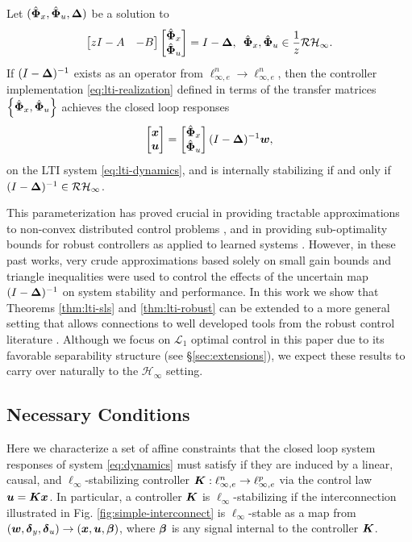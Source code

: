 \begin{theorem}\label{thm:lti-robust}
Let $(\hat{\boldsymbol{\Phi}}_x,\hat{\boldsymbol{\Phi}}_u,{\boldsymbol{\Delta}})$ be a solution to
\begin{equation}
\begin{bmatrix} zI - A & - B \end{bmatrix} \begin{bmatrix} \hat{\boldsymbol{\Phi}}_x \\ \hat{\boldsymbol{\Phi}}_u \end{bmatrix} = I - {\boldsymbol{\Delta}}, \, \ \hat{\boldsymbol{\Phi}}_x, \hat{\boldsymbol{\Phi}}_u \in \frac{1}{z}\mathcal{RH}_\infty.
\label{eq:lti-robust}
\end{equation}
If $(I-{\boldsymbol{\Delta}})^{-1}$ exists as an operator from $\ell^n_{\infty,e} \to \ell^n_{\infty,e}$, then the controller implementation \eqref{eq:lti-realization} defined in terms of the transfer matrices $\left\{\hat{\boldsymbol{\Phi}}_x,\hat{\boldsymbol{\Phi}}_u\right\}$ achieves the closed loop responses
\begin{equation}
\begin{bmatrix}\boldsymbol{x} \\ \boldsymbol{u} \end{bmatrix} = \begin{bmatrix} \hat{\boldsymbol{\Phi}}_x \\ \hat{\boldsymbol{\Phi}}_u \end{bmatrix}(I-{\boldsymbol{\Delta}})^{-1}\boldsymbol{w},
\end{equation}
on the LTI system \eqref{eq:lti-dynamics}, and is internally stabilizing if and only if $(I-{\boldsymbol{\Delta}})^{-1} \in \mathcal{RH}_\infty$.
\end{theorem}
This parameterization has proved crucial in providing tractable approximations to non-convex distributed control problems \cite{matni2017scalable}, and in providing sub-optimality bounds for robust controllers as applied to learned systems \cite{dean2017sample}.  However, in these past works, very crude approximations based solely on small gain bounds and triangle inequalities were used to control the effects of the uncertain map $(I-{\boldsymbol{\Delta}})^{-1}$ on system stability and performance.  In this work we show that Theorems \ref{thm:lti-sls} and \ref{thm:lti-robust} can be extended to a more general setting that allows connections to well developed tools from the robust control literature \cite{khammash1990stability,dahleh1994control}.  Although we focus on $\mathcal{L}_1$ optimal control in this paper due to its favorable separability structure (see \S \ref{sec:extensions}), we expect these results to carry over naturally to the $\mathcal{H}_\infty$ setting.

\subsection{Necessary Conditions}
Here we characterize a set of affine constraints that the closed loop system responses of system \eqref{eq:dynamics} must satisfy if they are induced by a linear, causal, and $\ell_\infty$-stabilizing controller $\boldsymbol{K} : \ell^n_{\infty,e} \to \ell^p_{\infty,e}$ via the control law $\boldsymbol{u} = \boldsymbol{K} \boldsymbol{x}$.  In particular, a controller $\boldsymbol{K}$ is $\ell_\infty$-stabilizing if the interconnection illustrated in Fig. \ref{fig:simple-interconnect} is $\ell_\infty$-stable as a map from $(\boldsymbol{w}, \boldsymbol{\delta}_y, \boldsymbol{\delta}_u)\to (\boldsymbol{x},\boldsymbol{u},\boldsymbol{\beta})$, where $\boldsymbol{\beta}$ is any signal internal to the controller $\boldsymbol{K}$.

